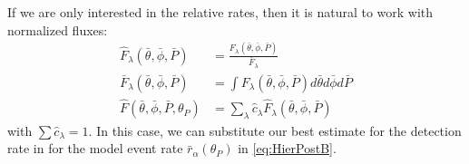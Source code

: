 \documentclass[twocolumn,showpacs,aps,prd,nobibnotes,nofootinbib,floatfix]{revtex4-1}
\begin{document}
If we are only interested in the relative rates, then it is natural to work with normalized fluxes:
\begin{align}
  \hat F_\lambda(\bar\theta,\bar\phi,\bar P)&=\frac{F_\lambda(\bar\theta,\bar\phi,\bar P)}{\bar F_\lambda}\nonumber\\
  \bar F_\lambda(\bar\theta,\bar\phi,\bar P)&=\int F_\lambda(\bar\theta,\bar\phi,\bar P) d\bar\theta d\bar\phi d\bar P\nonumber\\
  \hat F(\bar\theta,\bar\phi,\bar P,\theta_P)&=\sum_{\lambda} \hat c_\lambda \hat F_\lambda(\bar\theta,\bar\phi,\bar P)
\end{align}
with $\sum{\hat c_\lambda}=1$.  In this case, we can substitute our best estimate for the detection rate in for the model event rate $\bar r_\alpha(\theta_P)$ in \eqref{eq:HierPostB}.
\end{document}
